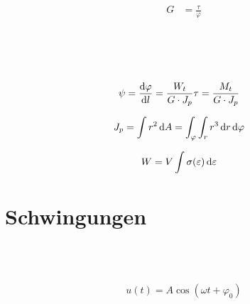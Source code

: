 \begin{boxleft}
\\
\end{boxleft}\begin{boxrightshaded}
\begin{align}
G&=\frac{\tau}{\varphi}
\end{align}
\end{boxrightshaded}

\begin{boxleft}
\\
\\
\\
\end{boxleft}\begin{boxrightshaded}
\begin{align}
\psi&=\frac{\mathop{}\!\mathrm{d} \varphi}{\mathop{}\!\mathrm{d} l}=\frac{W_t}{G\cdot J_p}\tau=\frac{M_t}{G\cdot J_p}
\end{align}
\end{boxrightshaded}

\begin{boxleft}
\end{boxleft}\begin{boxrightshaded}
\begin{align}
J_p&=\int r^2\mathop{}\!\mathrm{d} A=\int_\varphi\int_r r^3\mathop{}\!\mathrm{d} r \mathop{}\!\mathrm{d} \varphi 
\end{align}
\end{boxrightshaded}

\begin{boxleft}
\end{boxleft}\begin{boxrightshaded}
\begin{align}
W&=V\int \sigma(\varepsilon) \mathop{}\!\mathrm{d} \varepsilon 
\end{align}
\end{boxrightshaded}

\section{Schwingungen}


\begin{boxleft}
\\
\\
\end{boxleft}\begin{boxrightshaded}
\begin{align}
u(t)=A\cos(\omega t+\varphi_0)
\end{align}
\end{boxrightshaded}

